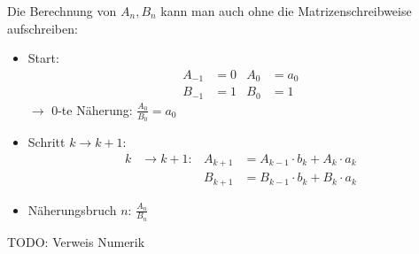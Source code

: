 Die Berechnung von $A_n, B_n$ kann man auch ohne die Matrizenschreibweise
aufschreiben:
\begin{itemize}
\item Start:
\begin{align*}
A_{-1} &= 0		&		A_0 &= a_0 \\
B_{-1} &= 1		&		B_0 &= 1 
\end{align*}
$\rightarrow$ 0-te Näherung: $\displaystyle\frac{A_0}{B_0} = a_0$
\item Schritt $k\to k+1$:
\[
\begin{aligned}
k &\rightarrow k + 1:
&
A_{k+1} &= A_{k-1} \cdot b_k + A_k \cdot a_k \\
&&
B_{k+1} &= B_{k-1} \cdot b_k + B_k \cdot a_k
\end{aligned}
\]
\item
Näherungsbruch $n$: \qquad$\displaystyle\frac{A_n}{B_n}$
\end{itemize}
{\color{red}TODO: Verweis Numerik}


